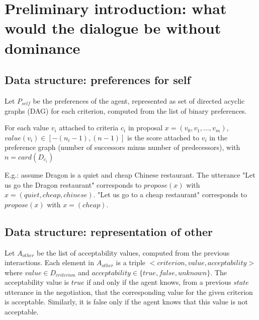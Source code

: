 \documentclass{llncs}
\begin{document}
	\title{\vskip -10pt}
	
	\author{Lydia Ould Ouali, Charles Rich \and
	Nicolas Sabouret }
	
	\maketitle 
	\begin{abstract}\vskip -20pt
	  
	\end{abstract}

\section{Preliminary introduction: what would the dialogue be without dominance}

\subsection{Data structure: preferences for self}
Let $P_{self}$ be the preferences of the agent, represented as set of directed acyclic graphs (DAG) for each criterion, computed from the list of binary preferences.

For each value $v_i$ attached to criteria $c_i$ in proposal $x=(v_0,v_1,\ldots,v_m)$, $value(v_i)\in[-(n_i-1),(n-1)]$ is the score attached to $v_i$ in the preference graph (number of successors minus number of predecessors), with $n=card(D_{c_i})$

E.g.: assume Dragon is a quiet and cheap Chinese restaurant. The utterance "Let us go the Dragon restaurant" corresponds to $propose(x)$ with $x=(quiet,cheap,chinese)$. "Let us go to a cheap restaurant" corresponds to $propose(x)$ with $x=(cheap)$.

\subsection{Data structure: representation of other}
Let $A_{other}$ be the list of acceptability values, computed from the previous interactions. Each element in $A_{other}$ is a triple $<criterion,value,acceptability>$ where $value\in D_{criterion}$ and $acceptability\in\{true,false,unknown\}$. The acceptability value is $true$ if and only if the agent knows, from a previous $state$ utterance in the negotiation, that the corresponding value for the given criterion is acceptable. Similarly, it is false only if the agent knows that this value is not acceptable.
\end{document}
